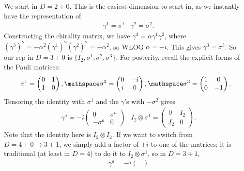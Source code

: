 \documentclass[11pt]{article}
\begin{document}
\begin{eexample}
    [Bootstrapping our way to Heaven ($D = 11$ supergravity)]
    We start in $D = 2 + 0$. This is the easiest dimension to
    start in, as we instantly have the representation of
    \begin{align*}
        & \gamma^1 = \sigma^1 & \gamma^2 = \sigma^2.
    \end{align*}
    Constructing the chirality matrix, we have $\gamma^3 = \alpha \gamma^1 \gamma^2$,
    where $(\gamma^3)^2 = - \alpha^2 (\gamma^1)^2 (\gamma^2)^2 = - \alpha^2$,
    so WLOG $\alpha = -i$. This gives $\gamma^3 = \sigma^3$. So our rep in $D = 3 + 0$
    is $\{ I_2, \sigma^1, \sigma^2, \sigma^3 \}$. For posterity,
    recall the explicit forms of the Pauli matrices:
    \begin{align*}
        \sigma^1 = \begin{pmatrix}
            0 & 1\\
            1 & 0
        \end{pmatrix},
        \mathspace
        \sigma^2 = \begin{pmatrix}
            0 & -i\\
            i & 0
        \end{pmatrix},
        \mathspace
        \sigma^3 = \begin{pmatrix}
            1 & 0\\
            0 & -1
        \end{pmatrix}.
    \end{align*}
    Tensoring the identity
    with $\sigma^1$ and the $\gamma$'s with $-\sigma^2$ gives
    \begin{align*}
        & \gamma^a = -i \begin{pmatrix}
            0 & \sigma^a\\
            - \sigma^a & 0
        \end{pmatrix}
        & I_2 \otimes \sigma^1 = \begin{pmatrix}
            0 & I_2\\
            I_2 & 0
        \end{pmatrix}.
    \end{align*}
    Note that the identity here is $I_2 \otimes I_2$. If we want
    to switch from $D = 4 + 0 \to 3 + 1$, we simply add a factor
    of $\pm i$ to one of the matrices; it is traditional (at least
    in $D = 4$) to do it to $I_2 \otimes \sigma^1$, so in $D = 3 + 1$,
    \begin{align*}
        & \gamma^a = -i \begin{pmatrix}

\end{pmatrix}
\end{align*}
\end{eexample}
\end{document}
